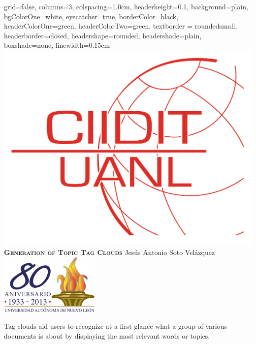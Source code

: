 \documentclass[a0paper, portrait]{baposter}
\begin{document}
\begin{poster}{
    grid=false,
    columns=3,
    colspacing=1.0cm, %
    headerheight=0.1\textheight,
    background=plain,
    bgColorOne=white,
    eyecatcher=true,
    borderColor=black,
    headerColorOne=green,
    headerColorTwo=green,
    textborder = roundedsmall,
    headerborder=closed,
    headershape=rounded,
    headershade=plain,
    boxshade=none,
    linewidth=0.15cm
}
  { \includegraphics[height=0.1\textheight]{ciidit.png} }
  {\bf\textsc{Generation of Topic Tag Clouds}} 
  {
    Jes\'us Antonio Soto Vel\'azquez 
  }
  {
    \includegraphics[height=8.0em]{uanl.png}
  }


   {
    Tag clouds aid users to recognize at a first glance what a group of various documents is about by displaying the most relevant words or topics.
    \newline

}
\end{poster}
\end{document}
